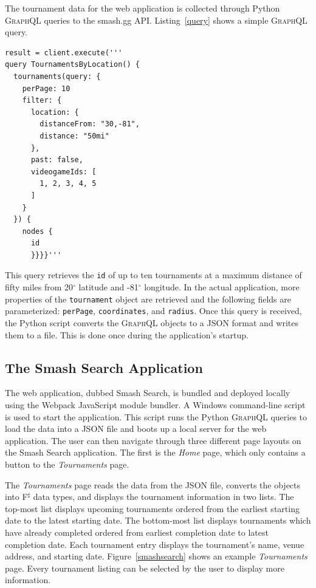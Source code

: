 \documentclass[sigconf]{acmart}
\begin{document}
The tournament data for the web application is collected through Python \textsc{GraphQL} queries to the smash.gg \textsc{API}. Listing~\ref{query} shows a simple \textsc{GraphQL} query.

\begin{lstlisting}[caption=Python \textsc{GraphQL} query example., label=query, captionpos=b]
result = client.execute('''
query TournamentsByLocation() {
  tournaments(query: {
    perPage: 10
    filter: {
      location: {
        distanceFrom: "30,-81",
        distance: "50mi"
      },
      past: false,
      videogameIds: [
        1, 2, 3, 4, 5
      ]
    }
  }) {
    nodes {
      id
      }}}}'''
\end{lstlisting}

This query retrieves the \texttt{id} of up to ten tournaments at a maximum distance of fifty miles from 20$^{\circ}$ latitude and -81$^{\circ}$ longitude. In the actual application, more properties of the \texttt{tournament} object are retrieved and the following fields are parameterized: \texttt{perPage}, \texttt{coordinates}, and \texttt{radius}. Once this query is received, the Python script converts the \textsc{GraphQL} objects to a \textsc{JSON} format and writes them to a file. This is done once during the application's startup. 

\subsection{The Smash Search Application}

The web application, dubbed Smash Search, is bundled and deployed locally using the Webpack JavaScript module bundler. A Windows command-line script is used to start the application. This script runs the Python \textsc{GraphQL} queries to load the data into a \textsc{JSON} file and boots up a local server for the web application. The user can then navigate through three different page layouts on the Smash Search application. The first is the \textit{Home} page, which only contains a button to the \textit{Tournaments} page.

The \textit{Tournaments} page reads the data from the \textsc{JSON} file, converts the objects into F$^{\sharp}$ data types, and displays the tournament information in two lists. The top-most list displays upcoming tournaments ordered from the earliest starting date to the latest starting date. The bottom-most list displays tournaments which have already completed ordered from earliest completion date to latest completion date. Each tournament entry displays the tournament's name, venue address, and starting date. Figure~\ref{smashsearch} shows an example \textit{Tournaments} page. Every tournament listing can be selected by the user to display more information.
\end{document}
